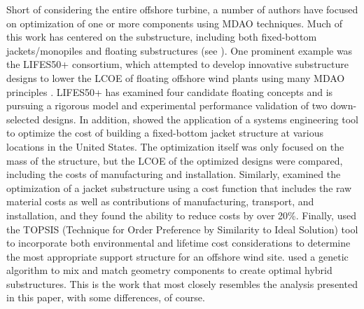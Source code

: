 Short of considering the entire offshore turbine, a number of authors
have focused on optimization of one or more components using MDAO
techniques. Much of this work has centered on the substructure,
including both fixed-bottom jackets/monopiles and floating substructures
(see \citep{muskulus2014}). One prominent example was the LIFES50+
consortium, which attempted to develop innovative substructure designs
to lower the LCOE of floating offshore wind plants using many MDAO
principles \citep{lifes50-framework}. LIFES50+ has examined four
candidate floating concepts and is pursuing a rigorous model and
experimental performance validation of two down-selected designs. In
addition, \citet{damiani2016} showed the application of a systems
engineering tool to optimize the cost of building a fixed-bottom jacket
structure at various locations in the United States. The optimization
itself was only focused on the mass of the structure, but the LCOE of
the optimized designs were compared, including the costs of
manufacturing and installation. Similarly, \citet{haafele2016} examined
the optimization of a jacket substructure using a cost function that
includes the raw material costs as well as contributions of
manufacturing, transport, and installation, and they found the ability
to reduce costs by over 20\%. Finally, \citet{lozano2011} used the
TOPSIS (Technique for Order Preference by Similarity to Ideal Solution)
tool to incorporate both environmental and lifetime cost considerations
to determine the most appropriate support structure for an offshore wind
site. \citet{karimi2017} used a genetic algorithm to mix and match
geometry components to create optimal hybrid substructures.  This is the
work that most closely resembles the analysis presented in this paper,
with some differences, of course.

